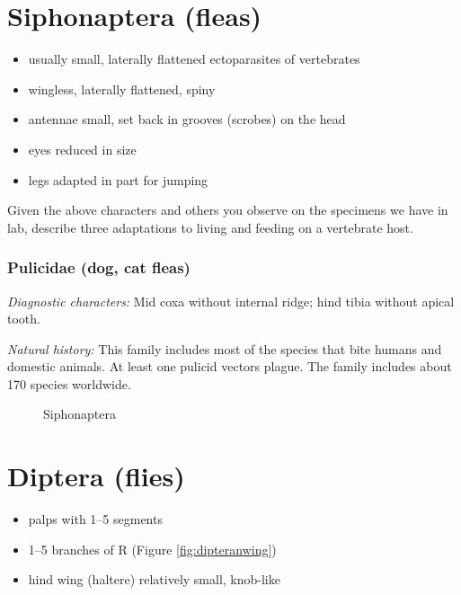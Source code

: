\section{Siphonaptera (fleas)}
\begin{itemize}
\item usually small, laterally flattened ectoparasites of vertebrates
\item wingless, laterally flattened, spiny
\item antennae small, set back in grooves (scrobes) on the head
\item eyes reduced in size
\item legs adapted in part for jumping
\end{itemize}

\begin{theo}
{}Given the above characters and others you observe on the specimens we have in lab, describe three adaptations to living and feeding on a vertebrate host.
\end{theo}

\subsubsection{Pulicidae (dog, cat fleas)}
\noindent{}\textit{Diagnostic characters:} Mid coxa without internal ridge; hind tibia without apical tooth.\vspace{3mm}

\noindent{}\textit{Natural history:} This family includes most of the species that bite humans and domestic animals. At least one pulicid vectors plague. The family includes about 170 species worldwide.

\begin{figure}[ht!]
  \centering
  \caption{Siphonaptera \cite[modified from Figs. 33C--E in][]{snodgrass1944feeding}}
  \label{fig:pulicid}
\end{figure}

\section{Diptera (flies)}
\begin{itemize}
\item palps with 1--5 segments
\item 1--5 branches of R (Figure \ref{fig:dipteranwing})
\item hind wing (haltere) relatively small, knob-like
\end{itemize}

